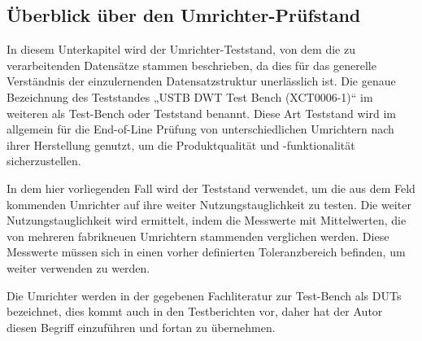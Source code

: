 
\subsection{Überblick über den Umrichter-Prüfstand}
\label{subsec:uberblick-uber-den-umrichter-prufstand}
In diesem Unterkapitel wird der Umrichter-Teststand, von dem die zu verarbeitenden Datensätze stammen beschrieben,
da dies für das generelle Verständnis der einzulernenden Datensatzstruktur unerlässlich ist.
Die genaue Bezeichnung des Teststandes „USTB DWT Test Bench (XCT0006-1)“ im weiteren als Test-Bench oder Teststand benannt.
Diese Art Teststand wird im allgemein für die End-of-Line Prüfung von unterschiedlichen Umrichtern nach ihrer Herstellung genutzt,
um die Produktqualität und -funktionalität sicherzustellen.\cite*{Main_Manuel_USTB2018}

In dem hier vorliegenden Fall wird der Teststand verwendet, um die aus dem Feld kommenden Umrichter auf ihre weiter Nutzungstauglichkeit zu testen.
Die weiter Nutzungstauglichkeit wird ermittelt, indem die Messwerte mit Mittelwerten, die von mehreren fabrikneuen Umrichtern stammenden verglichen werden.
Diese Messwerte müssen sich in einen vorher definierten Toleranzbereich befinden, um weiter verwenden zu werden.

Die Umrichter werden in der gegebenen Fachliteratur zur Test-Bench als \ac{DUTs} bezeichnet, dies kommt auch in den Testberichten vor,
daher hat der Autor diesen Begriff einzuführen und fortan zu übernehmen.

